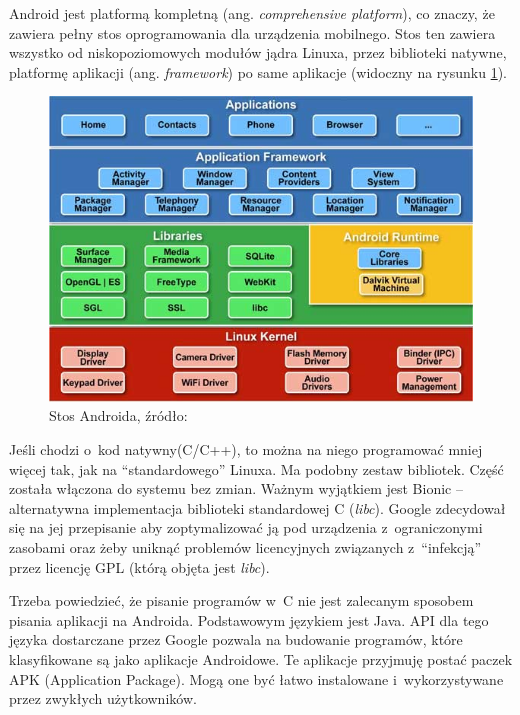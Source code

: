 Android jest platformą kompletną (ang. \emph{comprehensive platform}), co znaczy, że zawiera pełny stos oprogramowania dla urządzenia mobilnego. Stos ten zawiera wszystko od niskopoziomowych modułów jądra Linuxa, przez biblioteki natywne, platformę aplikacji (ang. \emph{framework}) po same aplikacje (widoczny na rysunku \ref{fig:android_architecture}).

\begin{figure}
	\centering
		\includegraphics[scale=0.7]{img/android_architecture.jpg}
	\caption{Stos Androida, źródło: \cite{androidstack}}
	\label{fig:android_architecture}	
\end{figure}

Jeśli chodzi o~kod natywny(C/C++), to można na niego programować mniej więcej tak, jak na ``standardowego'' Linuxa. Ma podobny zestaw bibliotek. Część została włączona do systemu bez zmian. Ważnym wyjątkiem jest Bionic -- alternatywna implementacja biblioteki standardowej C (\emph{libc}). Google zdecydował się na jej przepisanie aby zoptymalizować ją pod urządzenia z~ograniczonymi zasobami oraz żeby uniknąć problemów licencyjnych związanych z~``infekcją'' przez licencję GPL (którą objęta jest \emph{libc}).

Trzeba powiedzieć, że pisanie programów w~C nie jest zalecanym sposobem pisania aplikacji na Androida. Podstawowym językiem jest Java. API dla tego języka dostarczane przez Google pozwala na budowanie programów, które klasyfikowane są jako aplikacje Androidowe. Te aplikacje przyjmuję postać paczek APK (Application Package). Mogą one być łatwo instalowane i~wykorzystywane przez zwykłych użytkowników.

